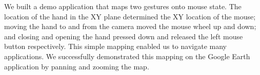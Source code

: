 We built a demo application that maps two gestures onto mouse state. The location of the hand in the XY plane determined the XY location of the mouse; moving the hand to and from the camera moved the mouse wheel up and down; and closing and opening the hand pressed down and released the left mouse button respectively. This simple mapping enabled us to navigate many applications. We successfully demonstrated this mapping on the Google Earth application \cite{googleearth} by panning and zooming the map.
